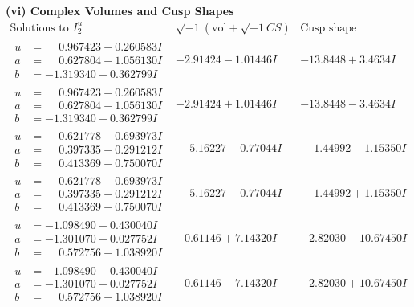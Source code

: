 \documentclass[1p]{elsarticle_modified}
\theoremstyle{definition}
\newcommand{\I}{\sqrt{-1}}
\begin{document}
\newpage\flushleft \textbf{(vi) Complex Volumes and Cusp Shapes}
$$\begin{array}{c|c|c}  
\text{Solutions to }I^u_{2}& \I (\text{vol} + \sqrt{-1}CS) & \text{Cusp shape}\\
 \hline 
\begin{aligned}
u &= \phantom{-}0.967423 + 0.260583 I \\
a &= \phantom{-}0.627804 + 1.056130 I \\
b &= -1.319340 + 0.362799 I\end{aligned}
 & -2.91424 - 1.01446 I & -13.8448 + 3.4634 I \\ \hline\begin{aligned}
u &= \phantom{-}0.967423 - 0.260583 I \\
a &= \phantom{-}0.627804 - 1.056130 I \\
b &= -1.319340 - 0.362799 I\end{aligned}
 & -2.91424 + 1.01446 I & -13.8448 - 3.4634 I \\ \hline\begin{aligned}
u &= \phantom{-}0.621778 + 0.693973 I \\
a &= \phantom{-}0.397335 + 0.291212 I \\
b &= \phantom{-}0.413369 - 0.750070 I\end{aligned}
 & \phantom{-}5.16227 + 0.77044 I & \phantom{-}1.44992 - 1.15350 I \\ \hline\begin{aligned}
u &= \phantom{-}0.621778 - 0.693973 I \\
a &= \phantom{-}0.397335 - 0.291212 I \\
b &= \phantom{-}0.413369 + 0.750070 I\end{aligned}
 & \phantom{-}5.16227 - 0.77044 I & \phantom{-}1.44992 + 1.15350 I \\ \hline\begin{aligned}
u &= -1.098490 + 0.430040 I \\
a &= -1.301070 + 0.027752 I \\
b &= \phantom{-}0.572756 + 1.038920 I\end{aligned}
 & -0.61146 + 7.14320 I & -2.82030 - 10.67450 I \\ \hline\begin{aligned}
u &= -1.098490 - 0.430040 I \\
a &= -1.301070 - 0.027752 I \\
b &= \phantom{-}0.572756 - 1.038920 I\end{aligned}
 & -0.61146 - 7.14320 I & -2.82030 + 10.67450 I \\ \hline\begin{aligned}

\end{aligned}
\end{array}$$
\end{document}
